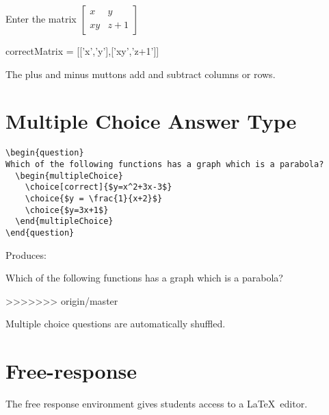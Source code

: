 \documentclass{ximera}
\begin{document}
\begin{question}
  Enter the matrix  \(\begin{bmatrix} x & y \\ xy & z+1 \end{bmatrix}\)
  \begin{matrixAnswer}
    correctMatrix = [['x','y'],['xy','z+1']]
  \end{matrixAnswer}
\end{question}

\begin{remark}
  The plus and minus muttons add and subtract columns or rows.  
\end{remark}



\section{Multiple Choice Answer Type}

\begin{verbatim}
\begin{question}
Which of the following functions has a graph which is a parabola?
  \begin{multipleChoice}
    \choice[correct]{$y=x^2+3x-3$}
    \choice{$y = \frac{1}{x+2}$}
    \choice{$y=3x+1$}
  \end{multipleChoice}
\end{question}
\end{verbatim}

Produces:

\begin{question}
  Which of the following functions has a graph which is a parabola?
  \begin{multipleChoice}
  \end{multipleChoice}
>>>>>>> origin/master
\end{question}

\begin{remark}
  Multiple choice questions are automatically shuffled.
\end{remark}



\section{Free-response}

The free response environment gives students access to a \LaTeX\ editor. 
\end{document}
